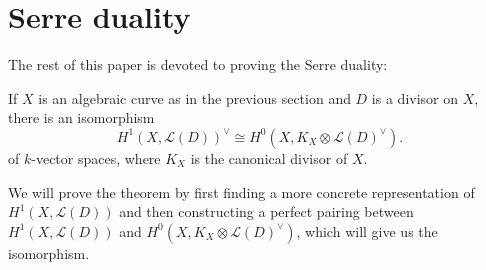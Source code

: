 \section{Serre duality}
The rest of this paper is devoted to proving the Serre duality:
\begin{thm}
  If $X$ is an algebraic curve as in the previous section
  and $D$ is a divisor on $X$, there is an isomorphism
  \[
    H^{1}(X, \mathcal{L}(D))^{\vee}\cong H^{0}(X, K_{X}
    \otimes \mathcal{L}(D)^{\vee}).
  \]
  of $k$-vector spaces, where $K_{X}$ is the canonical divisor of $X$.
\end{thm}
We will prove the theorem by first finding a more concrete representation of
$H^{1}(X,\mathcal{L}(D))$ and then constructing a perfect pairing between
$H^{1}(X,\mathcal{L}(D))$ and $H^{0}(X,K_{X}\otimes\mathcal{L}(D)^{\vee})$,
which will give us the isomorphism.

